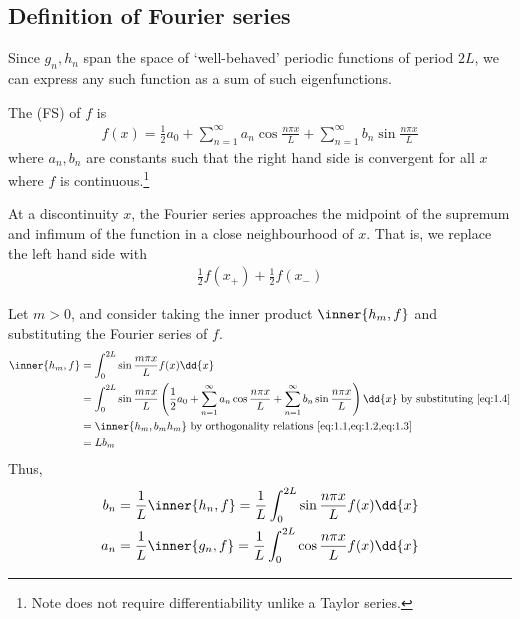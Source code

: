 \subsection{Definition of Fourier series}
Since $g_n, h_n$ span the space of `well-behaved' periodic functions of period $2L$, we can express any such function as a sum of such eigenfunctions.
\begin{definition}
    The  (FS) of $f$ is
    \begin{align} \label{eq:1.4}
        f(x) = \frac{1}{2}a_0 + \sum_{n=1}^\infty a_n \cos \frac{n \pi x}{L} + \sum_{n=1}^\infty b_n \sin \frac{n \pi x}{L}
    \end{align}
    where $a_n, b_n$ are constants such that the right hand side is convergent for all $x$ where $f$ is continuous.\footnote{Note does not require differentiability unlike a Taylor series.}
\end{definition}
At a discontinuity $x$, the Fourier series approaches the midpoint of the supremum and infimum of the function in a close neighbourhood of $x$.
That is, we replace the left hand side with
\begin{align*}
    \frac{1}{2}f(x_+) + \frac{1}{2}f(x_-)
\end{align*}

Let $m > 0$, and consider taking the inner product $\inner{h_m, f}$ and substituting the Fourier series of $f$.
\begin{align*}
    \inner{h_m, f} &= \int_0^{2L} \sin\frac{m \pi x}{L} f(x) \dd{x} \\
    &= \int_0^{2L} \sin\frac{m \pi x}{L} \left( \frac{1}{2}a_0 + \sum_{n=1}^\infty a_n \cos \frac{n \pi x}{L} + \sum_{n=1}^\infty b_n \sin \frac{n \pi x}{L} \right) \dd{x} \text{ by substituting \cref{eq:1.4}}\\
    & = \inner{h_m, b_m h_m} \text{ by orthogonality relations \cref{eq:1.1,eq:1.2,eq:1.3}}\\
    & = L b_m
\end{align*}
Thus,
\begin{equation}
    \begin{aligned}
    b_n = \frac{1}{L} \inner{h_n, f} = \frac{1}{L} \int_0^{2L} \sin\frac{n \pi x}{L} f(x) \dd{x} \\
    a_n = \frac{1}{L} \inner{g_n, f} = \frac{1}{L} \int_0^{2L} \cos\frac{n \pi x}{L} f(x) \dd{x}
    \end{aligned}
\end{equation}

